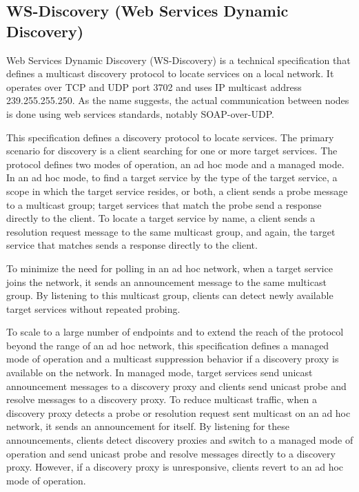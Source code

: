 \documentclass{note}
\begin{document}
\subsection{WS-Discovery (Web Services Dynamic Discovery)}
Web Services Dynamic Discovery (WS-Discovery) is a technical specification
that defines a multicast discovery protocol to locate services on a \textcolor{red2}{local
network}. It operates over TCP and UDP port 3702 and uses IP multicast address 
239.255.255.250. As the name suggests, the actual communication between nodes
is done using web services standards, notably SOAP-over-UDP.  


This specification defines a discovery protocol to locate services. The primary scenario for discovery is a client searching for one or more target services. The protocol defines two modes of operation, an ad hoc mode and a managed mode. In an ad hoc mode, to find a target service by the type of the target service, a scope in which the target service resides, or both, a client sends a probe message to a multicast group; target services that match the probe send a response directly to the client. To locate a target service by name, a client sends a resolution request message to the same multicast group, and again, the target service that matches sends a response directly to the client.

To minimize the need for polling in an ad hoc network, when a target service joins the network, it sends an announcement message to the same multicast group. By listening to this multicast group, clients can detect newly available target services without repeated probing.

To scale to a large number of endpoints and to extend the reach of the
protocol beyond the range of an ad hoc network, this specification defines a
managed mode of operation and a multicast suppression behavior if a discovery
proxy is available on the network. In managed mode, target services send
unicast announcement messages to a discovery proxy and clients send unicast
probe and resolve messages to a discovery proxy. To reduce multicast traffic,
when a discovery proxy detects a probe or resolution request sent multicast on
an ad hoc network, it sends an announcement for itself. By listening for these
announcements, clients detect discovery proxies and switch to a managed mode
of operation and send unicast probe and resolve messages directly to a
discovery proxy. However, if a discovery proxy is unresponsive, clients revert
to an ad hoc mode of operation. 
\end{document}
